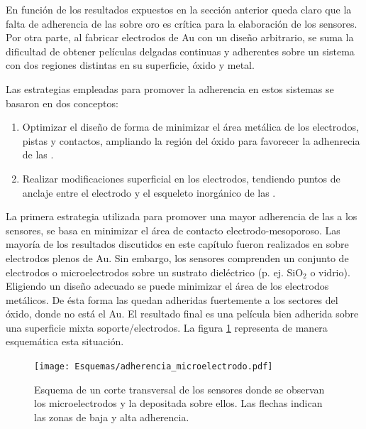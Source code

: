 			 En función de los resultados expuestos en la sección anterior queda claro que la falta de adherencia de las \pdm\space sobre oro es crítica para la elaboración de los sensores. Por otra parte, al fabricar electrodos de Au con un diseño arbitrario, se suma la dificultad de obtener películas delgadas continuas y adherentes sobre un sistema con dos regiones distintas en su superficie, óxido y metal.
 
             Las estrategias empleadas para promover la adherencia en estos sistemas se basaron en dos conceptos:
				\begin{enumerate}

					\item Optimizar el diseño de forma de minimizar el área metálica de los electrodos, pistas y contactos, ampliando la región del óxido para favorecer la adhenrecia de las \pdm.

					\item Realizar modificaciones superficial en los electrodos, tendiendo puntos de anclaje entre el electrodo y el esqueleto inorgánico de las \pdm.

					\end{enumerate}
			
			 La primera estrategia utilizada para promover una mayor adherencia de las \pdm\space a los sensores, se basa en minimizar el área de contacto electrodo-mesoporoso. Las mayoría de los resultados discutidos en este capítulo fueron realizados en \pdm\space sobre electrodos plenos de Au. Sin embargo, los sensores comprenden un conjunto de electrodos o microelectrodos sobre un sustrato dieléctrico (p. ej. SiO$_2$ o vidrio). Eligiendo un diseño adecuado se puede minimizar el área de los electrodos metálicos. De ésta forma las \pdm\space quedan adheridas fuertemente a los sectores del óxido, donde no está el Au. El resultado final es una película bien adherida sobre una superficie mixta soporte/electrodos.  La figura \ref{fig:adherencia_microelectrodo} representa de manera esquemática esta situación.
			
				\begin{figure}[!ht]
					\begin{center}
					\texttt{[image: Esquemas/adherencia\_microelectrodo.pdf]}
					\caption[Adherencia a los microelectrodos.]{Esquema de un corte transversal de los sensores donde se observan los microelectrodos y la \pdm\space depositada sobre ellos. Las flechas indican las zonas de baja y alta adherencia.}
					\label{fig:adherencia_microelectrodo}
					\end{center}
					\end{figure}
					
